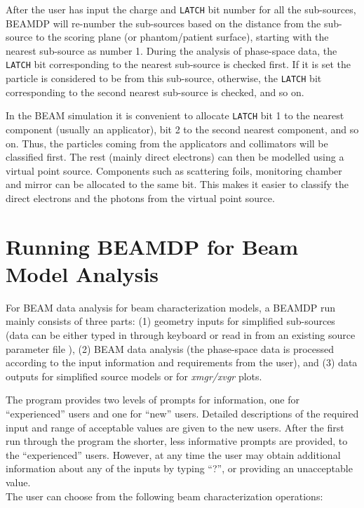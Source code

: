\documentclass[12pt,twoside]{article}
\begin{document}
After the user has input the charge and {\tt LATCH} bit number for all the
sub-sources, BEAMDP will re-number the sub-sources based on the distance from
the sub-source to the scoring plane (or phantom/patient surface), starting with
 the nearest sub-source as number 1. During the analysis of phase-space data,
the {\tt LATCH} bit corresponding to the nearest sub-source is checked first.
If it is set the particle is considered to be from this sub-source, otherwise,
the {\tt LATCH} bit corresponding to the second nearest sub-source is checked,
and so on.

In the BEAM simulation it is convenient to allocate {\tt LATCH} bit 1 to the
nearest component
(usually an applicator), bit 2 to the second nearest component, and so on.
Thus, the particles coming from the applicators and collimators
will be classified first. The rest (mainly direct electrons) can then be
modelled using a virtual point source. Components such as scattering foils,
monitoring chamber and mirror can be allocated to the same bit.
This makes it easier to classify the direct electrons and the photons
from the virtual point source.

\section{Running BEAMDP for Beam Model Analysis}

For BEAM data analysis for beam characterization models,  a BEAMDP run mainly consists of three parts: (1) geometry inputs for simplified sub-sources (data can be either typed in through keyboard or read in from an existing source parameter file ), (2) BEAM data analysis (the phase-space data is processed according to the input information and requirements from the user), and (3) data outputs for simplified source models or for {\it xmgr/xvgr} plots.

The program provides two levels of prompts for information, one for ``experienced'' users and one for ``new'' users. Detailed descriptions of the required input and range of acceptable values are given to the new users. After the first run through the program the shorter, less informative prompts are provided, to the ``experienced'' users. However, at any time the user may obtain additional information about any of the inputs by typing ``?'', or providing an unacceptable value.\\

The user can choose from the following beam characterization operations:
\end{document}
